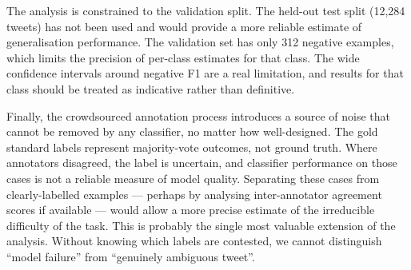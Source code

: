\documentclass[12pt]{article}
\begin{document}
The analysis is constrained to the validation split. The held-out test split (12,284 tweets) has not been used and would provide a more reliable estimate of generalisation performance. The validation set has only 312 negative examples, which limits the precision of per-class estimates for that class. The wide confidence intervals around negative F1 are a real limitation, and results for that class should be treated as indicative rather than definitive.

Finally, the crowdsourced annotation process introduces a source of noise that cannot be removed by any classifier, no matter how well-designed. The gold standard labels represent majority-vote outcomes, not ground truth. Where annotators disagreed, the label is uncertain, and classifier performance on those cases is not a reliable measure of model quality. Separating these cases from clearly-labelled examples --- perhaps by analysing inter-annotator agreement scores if available --- would allow a more precise estimate of the irreducible difficulty of the task. This is probably the single most valuable extension of the analysis. Without knowing which labels are contested, we cannot distinguish ``model failure'' from ``genuinely ambiguous tweet''.

\nocite{*}


\end{document}
